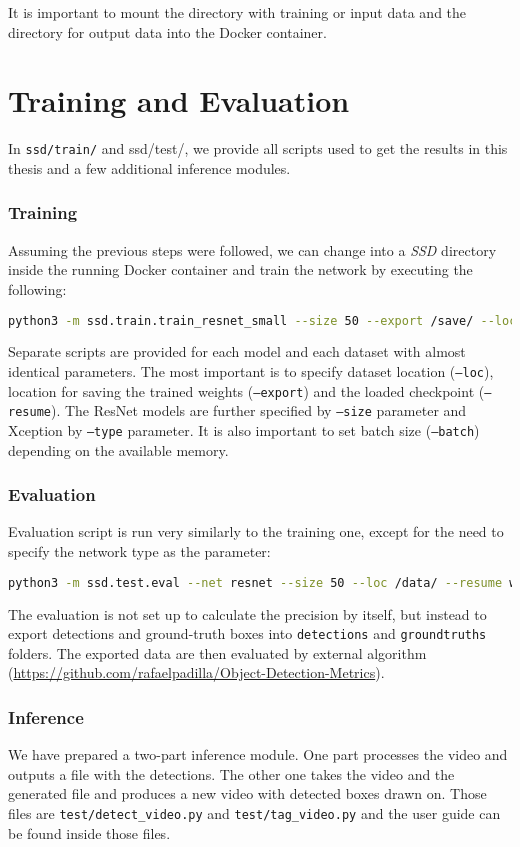 It is important to mount the directory with training or input data and the directory for output data into the Docker container.


\section{Training and Evaluation}

In {\tt ssd/train/} and {ssd/test/}, we provide all scripts used to get the results in this thesis and a few additional inference modules. 

\subsubsection{Training}
Assuming the previous steps were followed, we can change into a \textit{SSD} directory inside the running Docker container and train the network by executing the following:

\begin{lstlisting}[breaklines, frame=single, language=Bash, basicstyle=\ttfamily]
  python3 -m ssd.train.train_resnet_small --size 50 --export /save/ --loc /data/ --resume imgnet
\end{lstlisting}

Separate scripts are provided for each model and each dataset with almost identical parameters. The most important is to specify dataset location ({\tt --loc}), location for saving the trained weights ({\tt --export}) and the loaded checkpoint ({\tt --resume}). The ResNet models are further specified by {\tt --size} parameter and Xception by {\tt --type} parameter. It is also important to set batch size ({\tt --batch}) depending on the available memory. 

\subsubsection{Evaluation}
Evaluation script is run very similarly to the training one, except for the need to specify the network type as the parameter:
\begin{lstlisting}[breaklines, frame=single, language=Bash, basicstyle=\ttfamily]
  python3 -m ssd.test.eval --net resnet --size 50 --loc /data/ --resume weights --batch 16
\end{lstlisting}
The evaluation is not set up to calculate the precision by itself, but instead to export detections and ground-truth boxes into {\tt detections} and {\tt groundtruths} folders. The exported data are then evaluated by external algorithm (\url{https://github.com/rafaelpadilla/Object-Detection-Metrics}).

\subsubsection{Inference}
We have prepared a two-part inference module. One part processes the video and outputs a file with the detections. The other one takes the video and the generated file and produces a new video with detected boxes drawn on. Those files are {\tt test/detect\_video.py} and {\tt test/tag\_video.py} and the user guide can be found inside those files.

